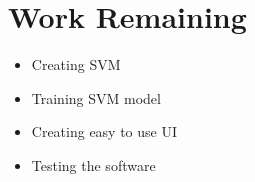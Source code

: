 \section{Work Remaining}
\vspace{-18pt}
\begin{itemize}
\item Creating SVM 
\item Training SVM model
\item Creating easy to use UI
\item Testing the software
\end{itemize}

\renewcommand\bibname{REFERENCES} %

